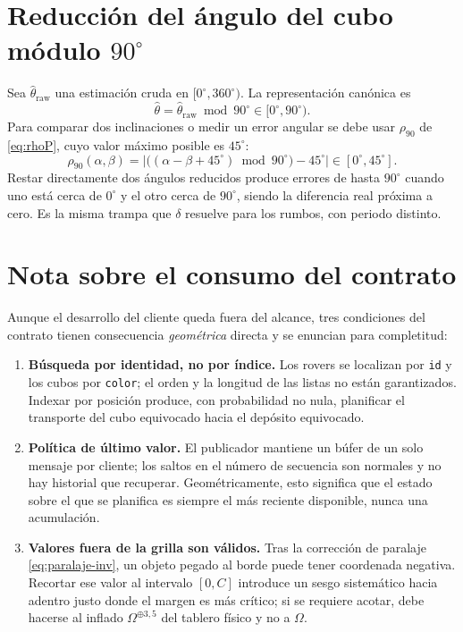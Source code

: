 \documentclass[11pt,a4paper]{article}
\theoremstyle{definition}
\newcommand{\grados}{^{\circ}}
\begin{document}
\section{Reducción del ángulo del cubo módulo $90\grados$}

Sea $\hat\theta_{\mathrm{raw}}$ una estimación cruda en $[0\grados,360\grados)$. La
representación canónica es
\[
  \hat\theta = \hat\theta_{\mathrm{raw}} \bmod 90\grados \in [0\grados,90\grados).
\]
Para comparar dos inclinaciones o medir un error angular se debe usar
$\rho_{90}$ de \eqref{eq:rhoP}, cuyo valor máximo posible es $45\grados$:
\[
  \rho_{90}(\alpha,\beta) = \Big|\big((\alpha-\beta+45\grados)\bmod 90\grados\big) - 45\grados\Big| \in [0\grados, 45\grados].
\]
Restar directamente dos ángulos reducidos produce errores de hasta $90\grados$ cuando
uno está cerca de $0\grados$ y el otro cerca de $90\grados$, siendo la diferencia real
próxima a cero. Es la misma trampa que $\delta$ resuelve para los rumbos, con periodo
distinto.

\section{Nota sobre el consumo del contrato}

Aunque el desarrollo del cliente queda fuera del alcance, tres condiciones del contrato
tienen consecuencia \emph{geométrica} directa y se enuncian para completitud:

\begin{enumerate}[label=(\alph*),leftmargin=2.4em,itemsep=3pt]
\item \textbf{Búsqueda por identidad, no por índice.} Los rovers se localizan por
      \texttt{id} y los cubos por \texttt{color}; el orden y la longitud de las listas no
      están garantizados. Indexar por posición produce, con probabilidad no nula,
      planificar el transporte del cubo equivocado hacia el depósito equivocado.
\item \textbf{Política de último valor.} El publicador mantiene un búfer de un solo
      mensaje por cliente; los saltos en el número de secuencia son normales y no hay
      historial que recuperar. Geométricamente, esto significa que el estado sobre el
      que se planifica es siempre el más reciente disponible, nunca una acumulación.
\item \textbf{Valores fuera de la grilla son válidos.} Tras la corrección de paralaje
      \eqref{eq:paralaje-inv}, un objeto pegado al borde puede tener coordenada negativa.
      Recortar ese valor al intervalo $[0,C]$ introduce un sesgo sistemático hacia
      adentro justo donde el margen es más crítico; si se requiere acotar, debe hacerse
      al inflado $\Omega^{\oplus 3{,}5}$ del tablero físico y no a $\Omega$.
\end{enumerate}
\end{document}

